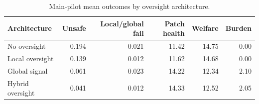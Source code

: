 \begin{table}[t]
    \centering
    \caption{Main-pilot mean outcomes by oversight architecture.}
    \label{tab:stagea-condition-means}
    \begin{tabular}{lrrrrr}
        \toprule
        Architecture & Unsafe & Local/global fail & Patch health & Welfare & Burden \\
        \midrule
        No oversight & 0.194 & 0.021 & 11.42 & 14.75 & 0.00 \\
        Local oversight & 0.139 & 0.012 & 11.62 & 14.68 & 0.00 \\
        Global signal & 0.061 & 0.023 & 14.22 & 12.34 & 2.10 \\
        Hybrid oversight & 0.041 & 0.012 & 14.33 & 12.52 & 2.05 \\
        \bottomrule
    \end{tabular}
\end{table}
